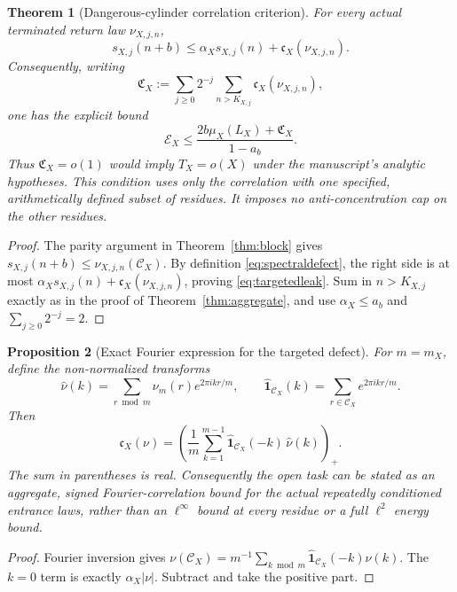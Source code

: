 \documentclass[11pt,a4paper]{article}
\newtheorem{theorem}{Theorem}
\newtheorem{proposition}[theorem]{Proposition}
\begin{document}
\begin{theorem}[Dangerous-cylinder correlation criterion]\label{thm:targeted}
For every actual terminated return law $\nu_{X,j,n}$,
\begin{equation}\label{eq:targetedleak}
 s_{X,j}(n+b)\le\alpha_Xs_{X,j}(n)+\mathfrak c_X(\nu_{X,j,n}).
\end{equation}
Consequently, writing
\[
 \mathfrak C_X:=\sum_{j\ge0}2^{-j}\sum_{n>K_{X,j}}\mathfrak c_X(\nu_{X,j,n}),
\]
one has the explicit bound
\begin{equation}\label{eq:targetedmain}
 \boxed{\quad\mathcal E_X\le\frac{2b\mu_X(L_X)+\mathfrak C_X}{1-a_b}.\quad}
\end{equation}
Thus $\mathfrak C_X=o(1)$ would imply $T_X=o(X)$ under the manuscript's analytic hypotheses. This condition uses only the correlation with \emph{one specified, arithmetically defined subset} of residues. It imposes no anti-concentration cap on the other residues.
\end{theorem}
\begin{proof}
The parity argument in Theorem~\ref{thm:block} gives $s_{X,j}(n+b)\le\nu_{X,j,n}(\mathcal C_X)$. By definition \eqref{eq:spectraldefect}, the right side is at most $\alpha_Xs_{X,j}(n)+\mathfrak c_X(\nu_{X,j,n})$, proving \eqref{eq:targetedleak}. Sum in $n>K_{X,j}$ exactly as in the proof of Theorem~\ref{thm:aggregate}, and use $\alpha_X\le a_b$ and $\sum_{j\ge0}2^{-j}=2$.
\end{proof}

\begin{proposition}[Exact Fourier expression for the targeted defect]\label{prop:targetfourier}
For $m=m_X$, define the non-normalized transforms
\[
 \widehat\nu(k)=\sum_{r\bmod m}\nu_m(r)e^{2\pi ikr/m},\qquad
 \widehat{\mathbf1}_{\mathcal C_X}(k)=\sum_{r\in\mathcal C_X}e^{2\pi ikr/m}.
\]
Then
\begin{equation}\label{eq:targetfourier}
 \boxed{\quad
 \mathfrak c_X(\nu)=\left(\frac1m\sum_{k=1}^{m-1}
       \widehat{\mathbf1}_{\mathcal C_X}(-k)\,\widehat\nu(k)\right)_+ .\quad}
\end{equation}
The sum in parentheses is real. Consequently the open task can be stated as an \emph{aggregate, signed Fourier-correlation bound} for the actual repeatedly conditioned entrance laws, rather than an $\ell^\infty$ bound at every residue or a full $\ell^2$ energy bound.
\end{proposition}
\begin{proof}
Fourier inversion gives $\nu(\mathcal C_X)=m^{-1}\sum_{k\bmod m}\widehat{\mathbf1}_{\mathcal C_X}(-k)\widehat\nu(k)$. The $k=0$ term is exactly $\alpha_X|\nu|$. Subtract and take the positive part.
\end{proof}
\end{document}

